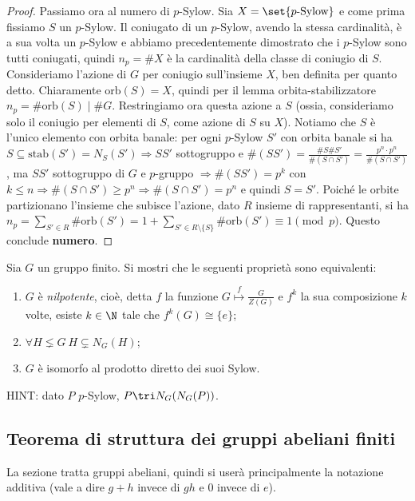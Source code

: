 \begin{proof}
    Passiamo ora al numero di $p$-Sylow. Sia $X = \set{ p\text{-Sylow}}$ e come prima fissiamo $S$ un $p$-Sylow. Il coniugato di un $p$-Sylow, avendo la stessa cardinalità, è a sua volta un $p$-Sylow e abbiamo precedentemente dimostrato che i $p$-Sylow sono tutti coniugati, quindi $n_p = \#X$ è la cardinalità della classe di coniugio di $S$. Consideriamo l'azione di $G$ per coniugio sull'insieme $X$, ben definita per quanto detto. Chiaramente $\text{orb}(S) = X$, quindi per il lemma orbita-stabilizzatore $n_p = \#\text{orb}(S) \mid \#G$. Restringiamo ora questa azione a $S$ (ossia, consideriamo solo il coniugio per elementi di $S$, come azione di $S$ su $X$). Notiamo che $S$ è l'unico elemento con orbita banale: per ogni $p$-Sylow $S'$ con orbita banale si ha $S \subseteq \text{stab}(S') = N_S(S') \Rightarrow SS'$ sottogruppo e $\#(SS') = \frac{\#S \#S'}{\#(S \cap S')} = \frac{p^n \cdot p^n}{\#(S \cap S')}$, ma $SS'$ sottogruppo di $G$ e $p$-gruppo $\Rightarrow \#(SS') = p^k$ con $k\leq n \Rightarrow \#(S\cap S') \geq p^n \Rightarrow \#(S\cap S') = p^n$ e quindi $S = S'$. Poiché le orbite partizionano l'insieme che subisce l'azione, dato $R$ insieme di rappresentanti, si ha $n_p = \sum_{S' \in R} \#\text{orb}(S') = 1 + \sum_{S' \in R\setminus\{S\}} \#\text{orb}(S') \equiv 1 \pmod{p}$. Questo conclude \textbf{numero}.
\end{proof}

\begin{exercise}
    Sia $G$ un gruppo finito. Si mostri che le seguenti proprietà sono equivalenti:
    \begin{enumerate}[label=$(\roman*)$]
        \item $G$ è \emph{nilpotente}, cioè, detta $f$ la funzione $G \overset{f}{\mapsto} \frac{G}{Z(G)}$ e $f^{k}$ la sua composizione $k$ volte, esiste $k \in \N$ tale che $f^k(G) \cong \{e\}$;
        \item $\forall H \lneq G \ H \subsetneq N_G(H)$;
        \item $G$ è isomorfo al prodotto diretto dei suoi Sylow.
    \end{enumerate}
    \tiny{HINT: dato $P$ $p$-Sylow, $P \tri N_G(N_G(P))$.}
\end{exercise}

\subsection{Teorema di struttura dei gruppi abeliani finiti}
La sezione tratta gruppi abeliani, quindi si userà principalmente la notazione additiva (vale a dire $g+h$ invece di $gh$ e $0$ invece di $e$).

